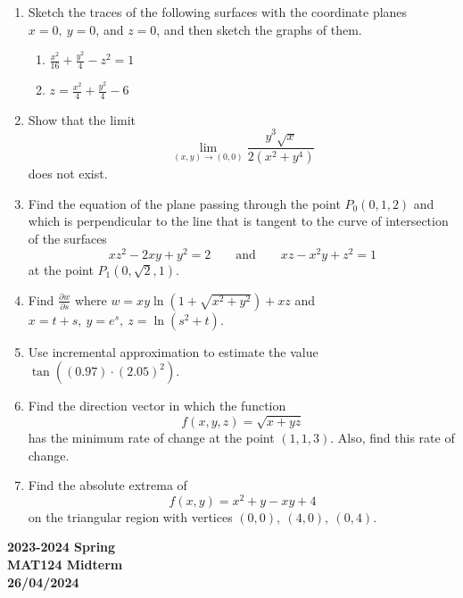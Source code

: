 \documentclass[a4paper, 12pt]{article}
\begin{document}
\begin{enumerate}[leftmargin=*,label=\textbf{\arabic*.}]
\item Sketch the traces of the following surfaces with the coordinate planes $x=0,\:y=0$, and $z=0$, and then sketch the graphs of them.

\begin{enumerate}[leftmargin=*,label=\textbf{\alph*.}]
\item $\displaystyle\frac{x^2}{16}+\frac{y^2}4-z^2=1$
\item $\displaystyle z=\frac{x^2}4+\frac{y^2}4-6$
\end{enumerate}

\item Show that the limit
\[\lim_{(x,y)\to(0,0)}\frac{y^3\sqrt x}{2\left(x^2+y^4\right)}\]
does not exist.

\item Find the equation of the plane passing through the point $P_0(0,1,2)$ and which is perpendicular to the line that is tangent to the curve of intersection of the surfaces
\[xz^2-2xy+y^2=2\qquad\text{and}\qquad xz-x^2y+z^2=1\]
at the point $P_1\left(0,\sqrt2, 1\right)$.

\item Find $\displaystyle\frac{\partial w}{\partial s}$ where $w=xy\ln\left(1+\sqrt{x^2+y^2}\right)+xz$ and $x=t+s,\:y={e}^s,\:z=\ln\left(s^2+t\right)$.

\item Use incremental approximation to estimate the value $\tan\left((0.97)\cdot(2.05)^2\right)$.

\item Find the direction vector in which the function
\[f(x,y,z)=\sqrt{x+yz}\]
has the minimum rate of change at the point $(1,1,3)$. Also, find this rate of change.

\item Find the absolute extrema of
\[f(x,y)=x^2+y-xy+4\]
on the triangular region with vertices $(0,0),\:(4,0),\:(0,4)$.
\end{enumerate}

\newpage
{}
{}
\begin{center}
\textbf{2023-2024 Spring \\MAT124 Midterm\\26/04/2024}
\end{center}
\end{document}
